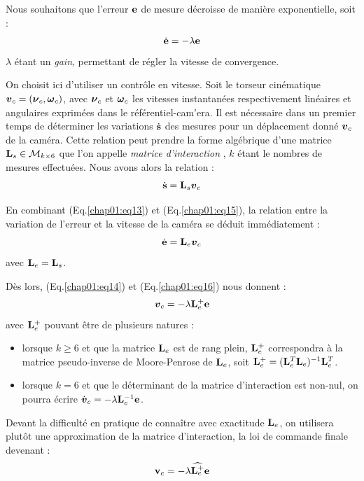 Nous souhaitons que l'erreur ${\bf e}$ de mesure décroisse de manière 
exponentielle, soit :
\begin{equation}
\dot {\bf e} = - \lambda {\bf e}
\label{chap01:eq14}
\end{equation}
$\lambda$ étant un {\it gain}, permettant de régler la vitesse de convergence.

On choisit ici d'utiliser un contr\^ole en vitesse. Soit le torseur cinématique 
$\hbox{\boldmath $v$}_c = (\hbox{\boldmath $\nu$}_c, \hbox{\boldmath $\omega$}_c)$, avec $\hbox{\boldmath $\nu$}_c$ et $\hbox{\boldmath $\omega$}_c$ les vitesses 
instantanées respectivement linéaires et angulaires exprim\'ees dans le 
r\'ef\'erentiel-cam'era. Il est nécessaire dans un premier temps de déterminer 
les variations $\dot {\bf s}$ des mesures pour un déplacement donné $\hbox{\boldmath $v$}_c$ de 
la caméra. Cette relation peut prendre la forme algébrique d'une matrice ${\bf 
L}_s \in \mathcal M_{k\times 6}$ que l'on appelle {\it matrice d'interaction} 
\cite{espiau1992}, $k$ \'etant le nombres de mesures effectuées. Nous avons 
alors la relation :
\begin{equation}
\dot {\bf s} = {\bf L}_s \hbox{\boldmath $v$}_c
\label{chap01:eq15}
\end{equation}

En combinant (Eq.\ref{chap01:eq13}) et (Eq.\ref{chap01:eq15}), la relation 
entre la variation de l'erreur et la vitesse de la cam\'era se d\'eduit 
imm\'ediatement :
\begin{equation}
\dot {\bf e} = {\bf L}_e \hbox{\boldmath $v$}_c
\label{chap01:eq16}
\end{equation}
avec ${\bf L}_e = {\bf L}_s$.

D\`es lors, (Eq.\ref{chap01:eq14}) et (Eq.\ref{chap01:eq16}) nous 
donnent :
\begin{equation}
{\hbox{\boldmath $v$}}_c = - \lambda {\bf L}^+_e {\bf e}
\label{chap01:eq17}
\end{equation}
avec ${\bf L}^+_e$ pouvant \^etre de plusieurs natures :
\begin{itemize}
 \item lorsque $k \geq 6$ et que la matrice ${\bf L}_e$ est de rang plein, 
${\bf L}^+_e$ correspondra \`a la matrice pseudo-inverse de Moore-Penrose de 
${\bf L}_e$, soit ${\bf L}^+_e = ({\bf L}_e^T{\bf L}_e)^{-1}{\bf L}_e^T$.
\item lorsque $k = 6$ et que le d\'eterminant de la matrice d'interaction est 
non-nul, on pourra \'ecrire $\dot {\hbox{\boldmath $v$}}_c = - \lambda {\bf L}^{-1}_e {\bf e}$.
\end{itemize}

Devant la difficult\'e en pratique de connaître avec exactitude ${\bf 
L}_e$, on utilisera plut\^ot une approximation de la matrice d'interaction, la 
loi de commande finale devenant :
\begin{equation}
{\bf v}_c = - \lambda \widehat {{\bf L}_e^+} {\bf e} 
\label{chap01:eq18}
\end{equation}

